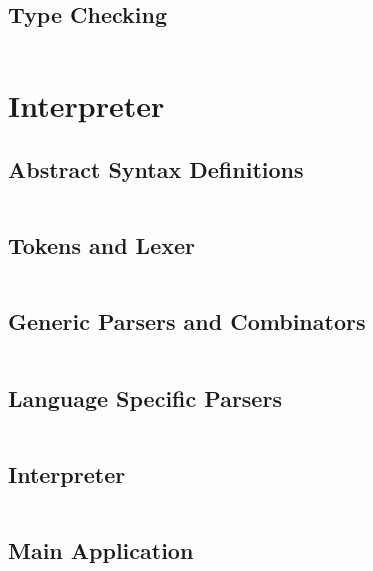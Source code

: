 \documentclass[a4paper,9pt]{article}
\newcommand{\hsfile}[1]{\inputminted[breaklines]{haskell}{../haskell/#1.hs}}
\begin{document}
\subsection{Type Checking}
\hsfile{exam2010/problem_4}
\section{Interpreter}
\subsection{Abstract Syntax Definitions}
\hsfile{interpreter/AbsSyn}
\subsection{Tokens and Lexer}
\hsfile{interpreter/Scanner}
\subsection{Generic Parsers and Combinators}
\hsfile{interpreter/ParserCombis2}
\subsection{Language Specific Parsers}
\hsfile{interpreter/Parser2}
\subsection{Interpreter}
\hsfile{interpreter/Interpreter}
\subsection{Main Application}
\hsfile{interpreter/Main}
\end{document}
